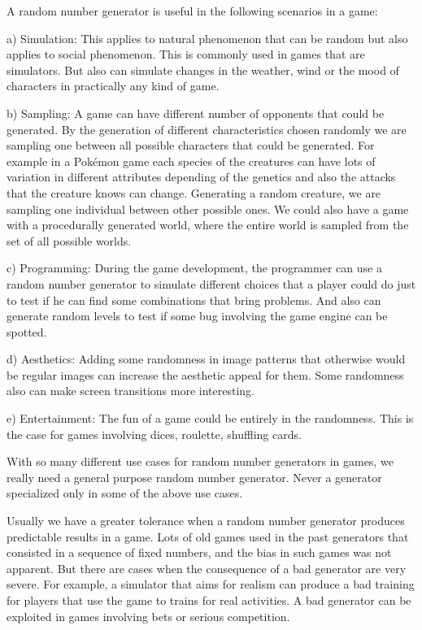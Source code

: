 A random number generator is useful in the following scenarios in a
game:

a) Simulation: This applies to natural phenomenon that can be random
 but also applies to social phenomenon. This is commonly used in games
 that are simulators. But also can simulate changes in the weather,
 wind or the mood of characters in practically any kind of game.

b) Sampling: A game can have different number of opponents that could
be generated. By the generation of different characteristics chosen
randomly we are sampling one between all possible characters that
could be generated. For example in a Pokémon game each species of the
creatures can have lots of variation in different attributes depending
of the genetics and also the attacks that the creature knows can
change. Generating a random creature, we are sampling one individual
between other possible ones. We could also have a game with a
procedurally generated world, where the entire world is sampled from
the set of all possible worlds.

c) Programming: During the game development, the programmer can use a
random number generator to simulate different choices that a player
could do just to test if he can find some combinations that bring
problems. And also can generate random levels to test if some bug
involving the game engine can be spotted.

d) Aesthetics: Adding some randomness in image patterns that otherwise
would be regular images can increase the aesthetic appeal for
them. Some randomness also can make screen transitions more
interesting.

e) Entertainment: The fun of a game could be entirely in the
randomness. This is the case for games involving dices, roulette,
shuffling cards.

With so many different use cases for random number generators in
games, we really need a general purpose random number generator. Never
a generator specialized only in some of the above use cases.

Usually we have a greater tolerance when a random number generator
produces predictable results in a game. Lots of old games used in the
past generators that consisted in a sequence of fixed numbers, and the
bias in such games was not apparent. But there are cases when the
consequence of a bad generator are very severe. For example, a
simulator that aims for realism can produce a bad training for players
that use the game to trains for real activities. A bad generator can
be exploited in games involving bets or serious competition.

